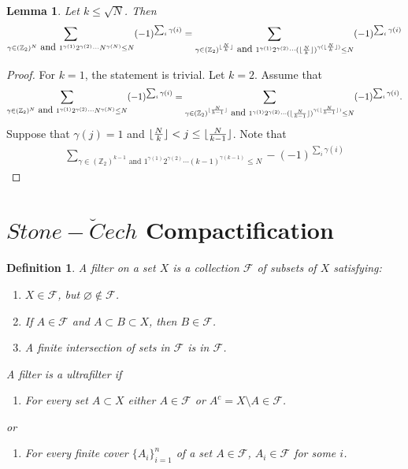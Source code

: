 \documentclass[a4paper,10pt]{amsart}
\newtheorem{definition}{Definition}[section]
\newtheorem{lemma}{Lemma}[section]
\newcommand{\FFF}{\mathcal F}
\newcommand{\Z}{\mathbb Z} %
\DeclarePairedDelimiter\floor{\lfloor}{\rfloor}
\begin{document}
\begin{lemma}
    Let $k \leq \sqrt{N}$. Then
    \begin{align*}
    \sum_{\gamma \in (\Z_{2})^{N} \mbox{ and } 
    1^{\gamma(1)}2^{\gamma(2)}\cdots N^{\gamma(N)} \leq N} 
    (-1)^{\sum_{i}\gamma(i)} 
    = \sum_{\gamma \in (\Z_{2})^{\floor{\frac{N}{k}}} \mbox{ and } 
    1^{\gamma(1)}2^{\gamma(2)}\cdots 
    (\floor{\frac{N}{k}})^{\gamma(\floor{\frac{N}{k}})} \leq N} 
    (-1)^{\sum_{i}\gamma(i)}
\end{align*}
\end{lemma}

\begin{proof}
   For $k = 1$, the statement is trivial. Let $k = 2$. 
       Assume that
    \begin{align*}
    \sum_{\gamma \in (\Z_{2})^{N} \mbox{ and } 
    1^{\gamma(1)}2^{\gamma(2)}\cdots N^{\gamma(N)} \leq N} 
    (-1)^{\sum_{i}\gamma(i)} 
    = \sum_{\gamma \in (\Z_{2})^{\floor{\frac{N}{k-1}}} \mbox{ and } 
    1^{\gamma(1)}2^{\gamma(2)}\cdots 
    (\floor{\frac{N}{k-1}})^{\gamma(\floor{\frac{N}{k-1}})} \leq N} 
    (-1)^{\sum_{i}\gamma(i)}.
\end{align*}
Suppose that $\gamma(j) = 1$ and 
$\floor{\frac{N}{k}} < j \leq \floor{\frac{N}{k-1}}$.
Note that
\begin{align*}
    \sum_{\gamma \in (\Z_{2})^{k-1} \mbox{ and } 
    1^{\gamma(1)}2^{\gamma(2)}\cdots (k-1)^{\gamma(k-1)} \leq N} 
    -(-1)^{\sum_{i}\gamma(i)} 
\end{align*}

\end{proof}

\section{$Stone-\breve{C}ech$ Compactification}

\begin{definition}
   A filter on a set $X$ is a collection $\FFF$ of subsets of $X$
   satisfying:
   \begin{enumerate}
       \item $X \in \FFF$, but $\varnothing \notin \FFF$.
       \item If $A \in \FFF$ and $A \subset B \subset X$, then 
           $B \in \FFF$.
       \item A finite intersection of sets in $\FFF$ is in $\FFF$.
   \end{enumerate}
   A filter is a ultrafilter if
   \begin{enumerate}[resume] 
       \item For every set $A \subset X$ either $A \in \FFF$
           or $A^{c} = X \setminus A \in \FFF$.  
   \end{enumerate}
   or
   \begin{enumerate}
    \item[(4)'] For every finite cover $\{A_{i}\}_{i=1}^{n}$ of a 
           set $A \in \FFF$, $A_{i} \in \FFF$ for some $i$.
   \end{enumerate}
\end{definition}
\end{document}
